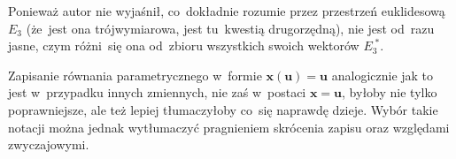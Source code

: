 \documentclass[a4paper,11pt]{article}
\begin{document}










\newpage


\vspace{0em}



\vspace{0em}


 Ponieważ autor nie wyjaśnił, co~dokładnie rozumie przez
przestrzeń euklidesową $E_{ 3 }$ (że~jest ona trójwymiarowa, jest
tu~kwestią drugorzędną), nie jest od~razu jasne, czym różni~się ona
od~zbioru wszystkich swoich wektorów $E_{ 3 }^{ \; * }$.

\vspace{\spaceFour}





 Zapisanie równania parametrycznego w~formie
$\boldsymbol{ x( u ) } = \boldsymbol{ u }$ analogicznie jak to jest
w~przypadku innych zmiennych, nie zaś w~postaci $\boldsymbol{ x } =
\mathbf{ u }$, byłoby nie tylko poprawniejsze, ale też lepiej
tłumaczyłoby co~się naprawdę dzieje. Wybór takie notacji można jednak
wytłumaczyć pragnieniem skrócenia zapisu oraz względami zwyczajowymi.

\vspace{\spaceFour}





\newpage


\vspace{\spaceFive}
\end{document}
